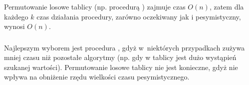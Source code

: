 \subsubsection{} %
Permutowanie losowe tablicy (np. procedurą ) zajmuje czas $O(n)$, zatem dla każdego $k$ czas działania procedury, zarówno oczekiwany jak i pesymistyczny, wynosi $O(n)$.

\subsubsection{} %
Najlepszym wyborem jest procedura , gdyż w~niektórych przypadkach zużywa mniej czasu niż pozostałe algorytmy (np. gdy w tablicy jest dużo wystąpień szukanej wartości). Permutowanie losowe tablicy nie jest konieczne, gdyż nie wpływa na obniżenie rzędu wielkości czasu pesymistycznego.

\endinput
